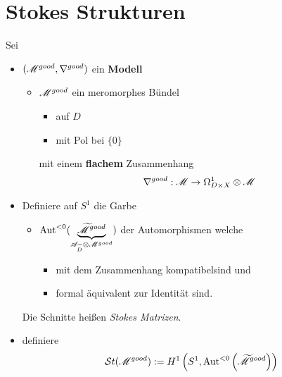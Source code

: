 \section{Stokes Strukturen} %
Sei
\begin{itemize}
  \item $(\mathscr{M}^{good},\nabla^{good})$ ein \textbf{Modell}
    \begin{itemize}
      \item $\mathscr{M}^{good}$ ein meromorphes Bündel
        \begin{itemize}
          \item auf $D$
          \item mit Pol bei $\{0\}$
        \end{itemize}
        mit einem \textbf{flachem} Zusammenhang
        \[
          \nabla^{good}:\mathscr{M}\to\Omega_{D\times X}^1\otimes \mathscr{M}
        \]
    \end{itemize}
\end{itemize}
\begin{defn}
  \begin{itemize}
    \item Definiere auf $S^1$ die Garbe
      \begin{itemize}
        \item $\operatorname{Aut}^{<0}(
          \underset{\mathscr{A}_{\widetilde D}\otimes\mathscr{M}^{good}}
          {\underbrace{\widetilde{\mathscr{M}}^{good}}})$ der Automorphismen
          welche
          \begin{itemize}
            \item mit dem Zusammenhang kompatibel\TODO[in Formeln] sind und
            \item formal äquivalent zur Identität sind.
          \end{itemize}
      \end{itemize}
      Die Schnitte heißen \emph{Stokes Matrizen}.
    \item definiere
      \[
        \mathcal{S}{}t(\mathscr{M}^{good})
          :=H^1\left(S^1,\operatorname{Aut}^{<0}\left(\widetilde {\mathscr{M}}^{good}\right)\right)
      \]
  \end{itemize}
  \begin{comment}
    \begin{itemize}
      \item Definiere die \emph{Stokes Garbe $\St_X(\sM^{good})$ auf $X$} als
        die Garbe zur Prägarbe
        \[
          U\mapsto
          H^1\left(S^1\times U,\Aut^{<X}\left(\tilde \sM^{good}\right)\right)
        \]
        \begin{thm}
          Die Stokes-Garbe $\St_X(\sM^{good})$ ist eine lokal konstante
          Garbe\footnote{von punktierten Mengen}.
        \end{thm}
    \end{itemize}
  \end{comment}
\end{defn}

